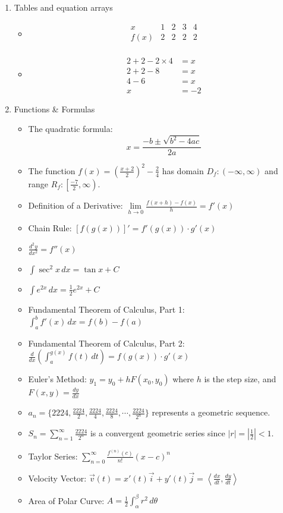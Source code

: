 \documentclass{article}
\begin{document}
\begin{enumerate}
    \item Tables and equation arrays
    \begin{itemize}
        \item
        \[
        \begin{array}{c|c|c|c|c}
        x & 1 & 2 & 3 & 4 \\
        f(x) & 2 & 2 & 2 & 2 \\
        \end{array}
        \]
        \item
        \begin{align}
        2 + 2 - 2 \times 4 &= x \\
        2 + 2 - 8 &= x \\
        4 - 6 &= x \\
        x &= -2
        \end{align}
    \end{itemize}

    \item Functions \& Formulas
    \begin{itemize}
        \item The quadratic formula:
        \[
        x = \frac{-b \pm \sqrt{b^2 - 4ac}}{2a}
        \]
        \item The function $f(x) = \left(\frac{x+2}{2}\right)^2 - \frac{2}{4}$ has domain $D_f : (-\infty,\infty)$ and range $R_f : \left[\frac{-7}{2},\infty\right)$.
        \item Definition of a Derivative: $\lim\limits_{h \to 0} \frac{f(x+h)-f(x)}{h} = f'(x)$
        \item Chain Rule: $\left[f(g(x))\right]' = f'(g(x)) \cdot g'(x)$
        \item $\frac{d^2y}{dx^2} = f''(x)$
        \item $\int \sec^2 x \,dx = \tan x + C$
        \item $\int e^{2x} \,dx = \frac{1}{2}e^{2x} + C$
        \item Fundamental Theorem of Calculus, Part 1: $\int_a^b f'(x) \,dx = f(b) - f(a)$
        \item Fundamental Theorem of Calculus, Part 2: $\frac{d}{dx} \left( \int_a^{g(x)} f(t) \,dt \right) = f(g(x)) \cdot g'(x)$
        \item Euler's Method: $y_1 = y_0 + hF(x_0, y_0)$ where $h$ is the step size, and $F(x, y) = \frac{dy}{dx}$
        \item $a_n = \{2224, \frac{2224}{2}, \frac{2224}{4}, \frac{2224}{8}, \cdots, \frac{2224}{2^n} \}$ represents a geometric sequence.
        \item $S_n = \sum_{n=1}^{\infty} \frac{2224}{2^n}$ is a convergent geometric series since $\left|r\right| = \left|\frac{1}{2}\right| < 1$.
        \item Taylor Series: $\sum_{n=0}^{\infty} \frac{f^{(n)}(c)}{n!} (x - c)^n$
        \item Velocity Vector: $\vec{v}(t) = x'(t)\vec{i} + y'(t)\vec{j} = \left\langle \frac{dx}{dt}, \frac{dy}{dt} \right\rangle$
        \item Area of Polar Curve: $A = \frac{1}{2} \int_{\alpha}^{\beta} r^2 \,d\theta$
    \end{itemize}
\end{enumerate}
\end{document}
